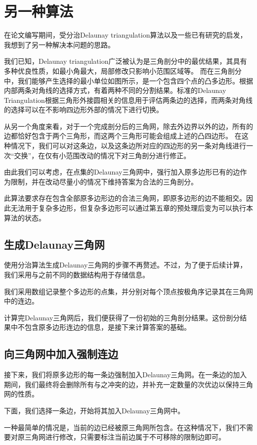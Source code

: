 \chapter{另一种算法}
在论文编写期间，受分治Delaunay triangulation算法以及一些已有研究的启发，我想到了另一种解决本问题的思路。

我们已知，Delaunay triangulation广泛被认为是三角剖分中的最优结果，其具有多种优良性质，如最小角最大，局部修改只影响小范围区域等。
而在三角剖分中，我们能够产生选择的最小单位如图所示，是一个包含四个点的凸多边形。根据内部两条对角线的选择方式，有着两种不同的分割结果。标准的Delaunay Triangulation根据三角形外接圆相关的信息用于评估两条边的选择，而两条对角线的选择可以在不影响四边形外部的情况下进行切换。

从另一个角度来看，对于一个完成剖分后的三角网，除去外边界以外的边，所有的边都恰好包含于两个三角形，而这两个三角形可能会组成上述的凸四边形。
在这种情况下，我们可以对这条边，以及这条边所对应的四边形的另一条对角线进行一次“交换”，在仅有小范围改动的情况下对三角剖分进行修正。

由此我们可以考虑，在点集的Delaunay三角网中，强行加入原多边形已有的边作为限制，并在改动尽量小的情况下维持答案为合法的三角剖分。

此算法要求存在包含全部原多边形边的合法三角网，即原多边形的边不能相交。因此无法用于复杂多边形，但复杂多边形可以通过第五章的预处理后变为可以执行本算法的状态。

\section{生成Delaunay三角网}
使用分治算法生成Delaunay三角网的步骤不再赘述。不过，为了便于后续计算，我们采用与之前不同的数据结构用于存储信息。

我们采用数组记录整个多边形的点集，并分别对每个顶点按极角序记录其在三角网中的连边。

计算完Delaunay三角网后，我们便获得了一份初始的三角剖分结果。这份剖分结果中不包含原多边形连边的信息，是接下来计算答案的基础。
\section{向三角网中加入强制连边}
接下来，我们将原多边形的每一条边强制加入Delaunay三角网。在一条边的加入期间，我们最终将会删除所有与之冲突的边，并补充一定数量的次优边以保持三角网的性质。

下面，我们选择一条边，开始将其加入Delaunay三角网中。

一种最简单的情况是，当前的边已经被原三角网所包含。在这种情况下，我们不需要对原三角网进行修改，只需要标注当前边属于不可移除的限制边即可。

